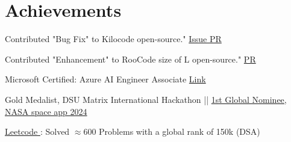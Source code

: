 \documentclass[a4paper]{extarticle}
\begin{document}
\section{Achievements}
    \begin{description}[font=$\bullet$]
    \item {Contributed "Bug Fix" to Kilocode open-source." {\href{https://github.com/Kilo-Org/kilocode/issues/2124}{Issue \faExternalLink}}{\href{https://github.com/Kilo-Org/kilocode/issues/2124}{ PR \faExternalLink}}}
    \vspace{-8 pt}
    \item {Contributed "Enhancement" to RooCode size of L open-source." {\href{https://github.com/RooCodeInc/Roo-Code/pull/6923}{PR \faExternalLink}}}
    \vspace{-8 pt}
    \item {Microsoft Certified: Azure AI Engineer Associate {\href{https://learn.microsoft.com/api/credentials/share/en-us/nitinprajwal/F40D908188BCABC6?sharingId=47FD6B032A1D04E5}{Link \faExternalLink}}}
    \vspace{-8 pt}
    \item{Gold Medalist, DSU Matrix International Hackathon || {\href{https://www.spaceappschallenge.org/nasa-space-apps-2024/find-a-team/aiastro/?tab=details}{1st Global Nominee, NASA space app 2024 \faExternalLink}}}
    \vspace{-8 pt}
    \item{ {\href{https://leetcode.com/u/nitinprajwal/}{Leetcode \faExternalLink} }: Solved \textbf{$\approx 600$} Problems with a global rank of 150k (DSA)}
    \end{description}
    
\end{document}
